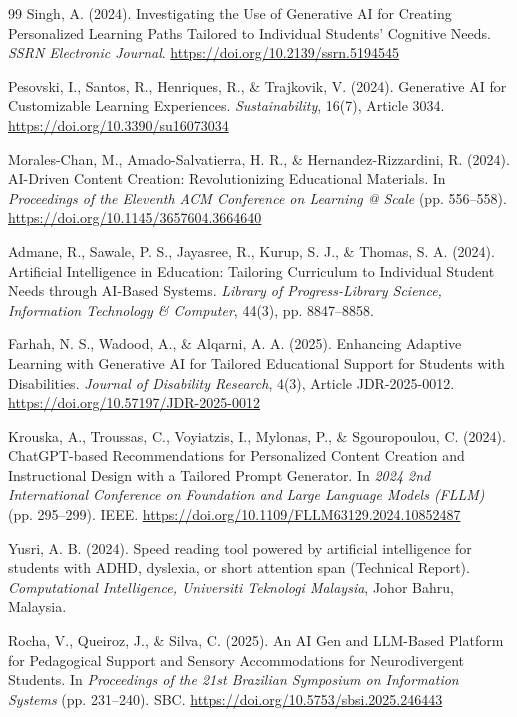 \documentclass[final,5p,times,twocolumn,authoryear]{elsarticle}
\begin{document}
\begin{thebibliography}{99}
Singh, A. (2024). Investigating the Use of Generative AI for Creating Personalized Learning Paths Tailored to Individual Students' Cognitive Needs. \textit{SSRN Electronic Journal}. \url{https://doi.org/10.2139/ssrn.5194545}

Pesovski, I., Santos, R., Henriques, R., \& Trajkovik, V. (2024). Generative AI for Customizable Learning Experiences. \textit{Sustainability}, 16(7), Article 3034. \url{https://doi.org/10.3390/su16073034}

Morales-Chan, M., Amado-Salvatierra, H. R., \& Hernandez-Rizzardini, R. (2024). AI-Driven Content Creation: Revolutionizing Educational Materials. In \textit{Proceedings of the Eleventh ACM Conference on Learning @ Scale} (pp. 556--558). \url{https://doi.org/10.1145/3657604.3664640}

Admane, R., Sawale, P. S., Jayasree, R., Kurup, S. J., \& Thomas, S. A. (2024). Artificial Intelligence in Education: Tailoring Curriculum to Individual Student Needs through AI-Based Systems. \textit{Library of Progress-Library Science, Information Technology \& Computer}, 44(3), pp. 8847--8858.

Farhah, N. S., Wadood, A., \& Alqarni, A. A. (2025). Enhancing Adaptive Learning with Generative AI for Tailored Educational Support for Students with Disabilities. \textit{Journal of Disability Research}, 4(3), Article JDR-2025-0012. \url{https://doi.org/10.57197/JDR-2025-0012}

Krouska, A., Troussas, C., Voyiatzis, I., Mylonas, P., \& Sgouropoulou, C. (2024). ChatGPT-based Recommendations for Personalized Content Creation and Instructional Design with a Tailored Prompt Generator. In \textit{2024 2nd International Conference on Foundation and Large Language Models (FLLM)} (pp. 295--299). IEEE. \url{https://doi.org/10.1109/FLLM63129.2024.10852487}

Yusri, A. B. (2024). Speed reading tool powered by artificial intelligence for students with ADHD, dyslexia, or short attention span (Technical Report). \textit{Computational Intelligence, Universiti Teknologi Malaysia}, Johor Bahru, Malaysia.

Rocha, V., Queiroz, J., \& Silva, C. (2025). An AI Gen and LLM-Based Platform for Pedagogical Support and Sensory Accommodations for Neurodivergent Students. In \textit{Proceedings of the 21st Brazilian Symposium on Information Systems} (pp. 231--240). SBC. \url{https://doi.org/10.5753/sbsi.2025.246443}


\end{thebibliography}
\end{document}
